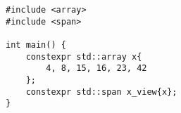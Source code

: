 \begin{lstlisting}[title=\href{https://godbolt.org/z/3CIQW_}{\texttt{godbolt.org/z/3CIQW\_}}]
#include <array>
#include <span>

int main() {
    constexpr std::array x{
        4, 8, 15, 16, 23, 42
    };
    constexpr std::span x_view{x};
}
\end{lstlisting}
